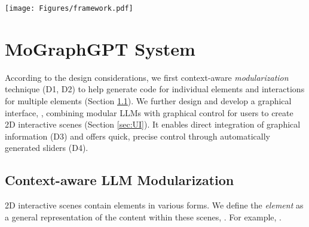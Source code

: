 \begin{figure*}[t]
\texttt{[image: Figures/framework.pdf]}
  \caption{
  }
  \label{fig:framework}
\end{figure*}

\section{MoGraphGPT System}




According to the design considerations, we first  context-aware \emph{modularization} technique (D1, D2) to help generate code for individual elements and interactions for multiple elements {(Section \ref{sec:LLM_modularization})}. We further design and develop a graphical interface, \sysName, combining modular LLMs with graphical control for users to create 2D interactive scenes {(Section \ref{sec:UI})}. It enables direct integration of graphical information (D3) and offers quick, precise control through automatically generated sliders (D4).



\subsection{ Context-aware LLM Modularization}\label{sec:LLM_modularization}
2D interactive scenes contain elements in various forms. We define the \emph{element} as {a} %
general representation of the content within these scenes, . For example, . 

